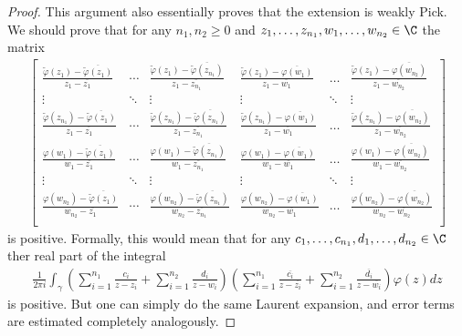 \begin{proof}
	This argument also essentially proves that the extension is weakly Pick. We should prove that for any $n_{1}, n_{2} \geq 0$ and $z_{1}, \ldots, z_{n_{1}}, w_{1}, \ldots, w_{n_{2}} \in \C$ the matrix
	\begin{align*}
		\begin{bmatrix}
			\frac{\tilde{\varphi}(z_{1}) - \overline{\tilde{\varphi}(z_{1})}}{z_{1} - \overline{z_{1}}} & \cdots & \frac{\tilde{\varphi}(z_{1}) - \overline{\tilde{\varphi}(z_{n_{1}})}}{z_{1} - \overline{z_{n_{1}}}} & \frac{\tilde{\varphi}(z_{1}) - \overline{\varphi(w_{1})}}{z_{1} - \overline{w_{1}}} & \ldots & \frac{\tilde{\varphi}(z_{1}) - \overline{\varphi(w_{n_{2}})}}{z_{1} - \overline{w_{n_{2}}}} \\
			\vdots & \ddots & \vdots & \vdots & \ddots & \vdots \\
			\frac{\tilde{\varphi}(z_{n_{1}}) - \overline{\tilde{\varphi}(z_{1})}}{z_{1} - \overline{z_{1}}} & \cdots & \frac{\tilde{\varphi}(z_{n_{1}}) - \overline{\tilde{\varphi}(z_{n_{1}})}}{z_{1} - \overline{z_{n_{1}}}} & \frac{\tilde{\varphi}(z_{n_{1}}) - \overline{\varphi(w_{1})}}{z_{1} - \overline{w_{1}}} & \ldots & \frac{\tilde{\varphi}(z_{n_{1}}) - \overline{\varphi(w_{n_{2}})}}{z_{1} - \overline{w_{n_{2}}}} \\
			\frac{\varphi(w_{1}) - \overline{\tilde{\varphi}(z_{1})}}{w_{1} - \overline{z_{1}}} & \cdots & \frac{\varphi(w_{1}) - \overline{\tilde{\varphi}(z_{n_{1}})}}{w_{1} - \overline{z_{n_{1}}}} & \frac{\varphi(w_{1}) - \overline{\varphi(w_{1})}}{w_{1} - \overline{w_{1}}} & \ldots & \frac{\varphi(w_{1}) - \overline{\varphi(w_{n_{2}})}}{w_{1} - \overline{w_{n_{2}}}} \\
			\vdots & \ddots & \vdots & \vdots & \ddots & \vdots \\
			\frac{\varphi(w_{n_{2}}) - \overline{\tilde{\varphi}(z_{1})}}{w_{n_{2}} - \overline{z_{1}}} & \cdots & \frac{\varphi(w_{n_{2}}) - \overline{\tilde{\varphi}(z_{n_{1}})}}{w_{n_{2}} - \overline{z_{n_{1}}}} & \frac{\varphi(w_{n_{2}}) - \overline{\varphi(w_{1})}}{w_{n_{2}} - \overline{w_{1}}} & \ldots & \frac{\varphi(w_{n_{2}}) - \overline{\varphi(w_{n_{2}})}}{w_{n_{2}} - \overline{w_{n_{2}}}} \\
		\end{bmatrix}
	\end{align*}
	is positive. Formally, this would mean that for any $c_{1}, \ldots, c_{n_{1}}, d_{1}, \ldots, d_{n_{2}} \in \C$ ther real part of the integral
	\begin{align*}
		\frac{1}{2 \pi i}\int_{\gamma} \left(\sum_{i = 1}^{n_{1}} \frac{c_{i}}{z - z_{i}} + \sum_{i = 1}^{n_{2}} \frac{d_{i}}{z - w_{i}}\right) \left(\sum_{i = 1}^{n_{1}} \frac{\overline{c_{i}}}{z - \overline{z_{i}}} + \sum_{i = 1}^{n_{2}} \frac{\overline{d_{i}}}{z - \overline{w_{i}}}\right) \varphi(z) dz
	\end{align*}
	is positive. But one can simply do the same Laurent expansion, and error terms are estimated completely analogously.
\end{proof}

